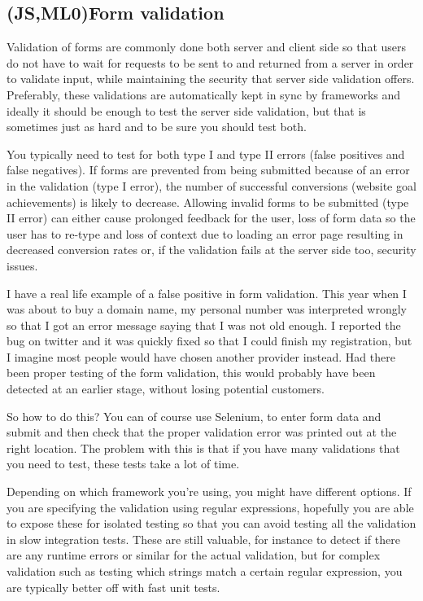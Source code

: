 \documentclass[11pt]{article}
\begin{document}
\subsection{(JS,ML0)Form validation}

Validation of forms are commonly done both server and client side so that users do not have to wait for requests to be sent to and returned from a server in order to validate input, while maintaining the security that server side validation offers. Preferably, these validations are automatically kept in sync by frameworks and ideally it should be enough to test the server side validation, but that is sometimes just as hard and to be sure you should test both.

You typically need to test for both type I and type II errors (false positives and false negatives). If forms are prevented from being submitted because of an error in the validation (type I error), the number of successful conversions (website goal achievements) is likely to decrease. Allowing invalid forms to be submitted (type II error) can either cause prolonged feedback for the user, loss of form data so the user has to re-type and loss of context due to loading an error page resulting in decreased conversion rates or, if the validation fails at the server side too, security issues.

I have a real life example of a false positive in form validation. This year when I was about to buy a domain name, my personal number was interpreted wrongly so that I got an error message saying that I was not old enough. I reported the bug on twitter and it was quickly fixed so that I could finish my registration, but I imagine most people would have chosen another provider instead. Had there been proper testing of the form validation, this would probably have been detected at an earlier stage, without losing potential customers. \cite{TwitterMe}

So how to do this? You can of course use Selenium, to enter form data and submit and then check that the proper validation error was printed out at the right location. The problem with this is that if you have many validations that you need to test, these tests take a lot of time.

Depending on which framework you're using, you might have different options. If you are specifying the validation using regular expressions, hopefully you are able to expose these for isolated testing so that you can avoid testing all the validation in slow integration tests. These are still valuable, for instance to detect if there are any runtime errors or similar for the actual validation, but for complex validation such as testing which strings match a certain regular expression, you are typically better off with fast unit tests.
\end{document}
